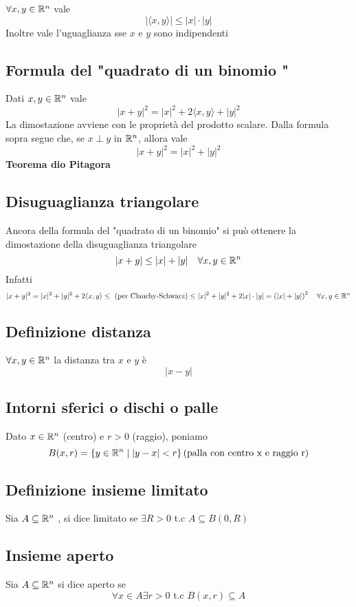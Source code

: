 \documentclass[a4paper]{article}
\begin{document}
$\forall x,y \in \mathbb{R} ^ n $ vale 
$$
| \langle x,y \rangle | \le |x| \cdot |y|
$$
Inoltre vale l'uguaglianza sse $x$ e $y$ sono indipendenti

\subsection { Formula del "quadrato di un binomio " }
Dati $ x,y \in \mathbb{R} ^ n $ vale $$ | x+y | ^2 = |x| ^ 2 + 2 \langle x,y \rangle + |y|^2 $$
La dimostazione avviene con le proprietà del prodotto scalare.
Dalla formula sopra segue che, se $ x \perp y $ in $ \mathbb{R} ^ n $, allora vale
$$
| x +y | ^ 2 = | x | ^ 2 + | y | ^ 2 
$$ 
\textbf { Teorema dio Pitagora }

\subsection { Disuguaglianza triangolare }
Ancora della formula del "quadrato di un binomio" si può ottenere la dimostazione della disuguaglianza triangolare
$$
|x+y| \le |x| + |y| \quad \forall x,y \in \mathbb{R} ^ n 
$$
Infatti
$$
| x+y |^2 = |x|^2 + |y|^2 +2 \langle x, y \rangle \\
\le \text{ (per Clauchy-Schwarz)} \le |x|^2 + |y|^2 +2 | x | \cdot | y| \\
= \left ( | x|+|y| \right ) ^2 \quad \forall x,y \in \mathbb{R} ^ n
$$
\subsection{Definizione distanza}
$ \forall x,y \in \mathbb{R} ^ n$ la distanza tra $x$ e $y$ è 
$$
| x-y |
$$

\subsection{ Intorni sferici o dischi o palle }
Dato $ x \in \mathbb{R} ^ n $ (centro) e $ r > 0 $ (raggio), poniamo
$$
B(x,r)= \left \{ y \in \mathbb{R} ^ n \mid |y-x| < r \right \} \mbox{(palla con centro x e raggio r)}
$$

\subsection{ Definizione insieme limitato } 
Sia $A \subseteq \mathbb{R} ^n $ , si dice limitato se $ \exists R > 0 $ t.c $ A \subseteq B(0,R) $ 

\subsection { Insieme aperto } 
Sia $ A \subseteq \mathbb{R} ^ n $ si dice aperto se
$$
\forall x \in A \exists r > 0 \text{ t.c } B(x,r) \subseteq A
$$
\end{document}
